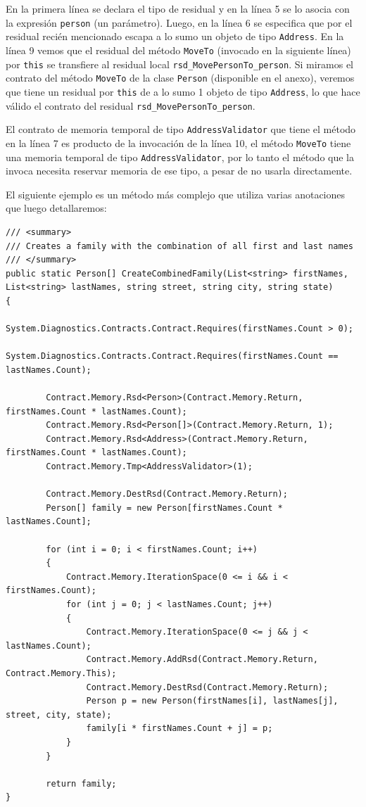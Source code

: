 \documentclass[12pt,a4paper]{article}
\newcommand\mono[1]{\texttt{#1}}
\begin{document}
			En la primera línea se declara el tipo de residual y en la línea 5 se lo asocia con la expresión \mono{person} (un parámetro). Luego, en la línea 6 se especifica que por el residual recién mencionado escapa a lo sumo un objeto de tipo \mono{Address}. En la línea 9 vemos que el residual del método \mono{MoveTo} (invocado en la siguiente línea) por \mono{this} se transfiere al residual local \mono{rsd\_MovePersonTo\_person}. Si miramos el contrato del método \mono{MoveTo} de la clase \mono{Person} (disponible en el anexo), veremos que tiene un residual por \mono{this} de a lo sumo 1 objeto de tipo \mono{Address}, lo que hace válido el contrato del residual \mono{rsd\_MovePersonTo\_person}.

			El contrato de memoria temporal de tipo \mono{AddressValidator} que tiene el método en la línea 7 es producto de la invocación de la línea 10, el método \mono{MoveTo} tiene una memoria temporal de tipo \mono{AddressValidator}, por lo tanto el método que la invoca necesita reservar memoria de ese tipo, a pesar de no usarla directamente.

			El siguiente ejemplo es un método más complejo que utiliza varias anotaciones que luego detallaremos:

			\vspace{15pt}
			\begin{footnotesize}
			\begin{lstlisting}[caption=Especificación de residuales con transferencias y loops, label=ejrsdotros]
/// <summary>
/// Creates a family with the combination of all first and last names
/// </summary>
public static Person[] CreateCombinedFamily(List<string> firstNames, List<string> lastNames, string street, string city, string state)
{
		System.Diagnostics.Contracts.Contract.Requires(firstNames.Count > 0);
		System.Diagnostics.Contracts.Contract.Requires(firstNames.Count == lastNames.Count);

		Contract.Memory.Rsd<Person>(Contract.Memory.Return, firstNames.Count * lastNames.Count);
		Contract.Memory.Rsd<Person[]>(Contract.Memory.Return, 1);
		Contract.Memory.Rsd<Address>(Contract.Memory.Return, firstNames.Count * lastNames.Count);
		Contract.Memory.Tmp<AddressValidator>(1);

		Contract.Memory.DestRsd(Contract.Memory.Return);
		Person[] family = new Person[firstNames.Count * lastNames.Count];

		for (int i = 0; i < firstNames.Count; i++)
		{
			Contract.Memory.IterationSpace(0 <= i && i < firstNames.Count);
			for (int j = 0; j < lastNames.Count; j++)
			{
				Contract.Memory.IterationSpace(0 <= j && j < lastNames.Count);
				Contract.Memory.AddRsd(Contract.Memory.Return, Contract.Memory.This);
				Contract.Memory.DestRsd(Contract.Memory.Return);
				Person p = new Person(firstNames[i], lastNames[j], street, city, state);
				family[i * firstNames.Count + j] = p;
			}
		}

		return family;
}
			\end{lstlisting}
			\end{footnotesize}
\end{document}
